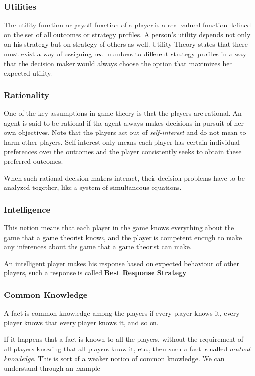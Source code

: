 \documentclass{article}
\theoremstyle{definition}
\begin{document}
\subsubsection{Utilities}
The utility function or payoff function of a player is a real valued function defined on the set of all outcomes or strategy profiles. A person's utility depends not only on his strategy but on strategy of others as well. Utility Theory states that there must exist a way of assigning real numbers to different strategy profiles in a way that the decision maker would always choose the option that maximizes her expected utility.
\subsubsection{Rationality}
One of the key assumptions in game theory is that the players are rational. An agent is said to be rational if the agent always makes decisions in pursuit of her own objectives. Note that the players act out of \textit{self-interest} and do not mean to harm other players. Self interest only means each player has certain individual preferences over the outcomes and the player consistently seeks to obtain these preferred outcomes.

When such rational decision makers interact, their decision problems have to be analyzed together, like a system of simultaneous equations.
\subsubsection{Intelligence}
This notion means that each player in the game knows everything about the game that a game theorist knows, and the player is competent enough to make any inferences about the game that a game theorist can make.

An intelligent player makes his response based on expected behaviour of other players, such a response is called \textbf{Best Response Strategy}
\subsubsection{Common Knowledge}
A fact is common knowledge among the players if every player knows it, every player knows that every player knows it, and so on. 

If it happens that a fact is known to all the players, without the requirement of all players knowing that all players know it, etc., then such a fact is called \textit{mutual knowledge}. This is sort of a weaker notion of common knowledge. We can understand through an example\\
\end{document}
